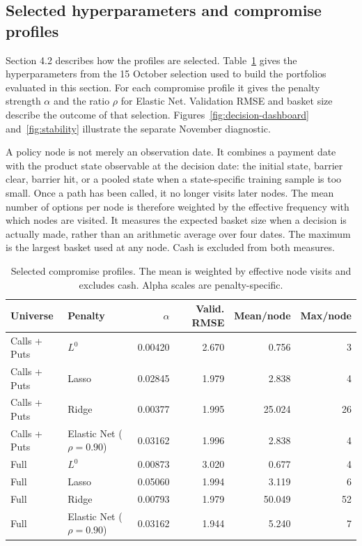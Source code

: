 \subsection{Selected hyperparameters and compromise profiles}

Section 4.2 describes how the profiles are selected. Table~\ref{tab:selected} gives the hyperparameters from the 15 October selection used to build the portfolios evaluated in this section. For each compromise profile it gives the penalty strength $\alpha$ and the ratio $\rho$ for Elastic Net. Validation RMSE and basket size describe the outcome of that selection. Figures~\ref{fig:decision-dashboard} and~\ref{fig:stability} illustrate the separate November diagnostic.

A policy node is not merely an observation date. It combines a payment date with the product state observable at the decision date: the initial state, barrier clear, barrier hit, or a pooled state when a state-specific training sample is too small. Once a path has been called, it no longer visits later nodes. The mean number of options per node is therefore weighted by the effective frequency with which nodes are visited. It measures the expected basket size when a decision is actually made, rather than an arithmetic average over four dates. The maximum is the largest basket used at any node. Cash is excluded from both measures.

\begin{table}[htbp]
\centering
\small
\begin{tabular}{llrrrr}
\toprule
Universe & Penalty & $\alpha$ & Valid. RMSE & Mean/node & Max/node \\
\midrule
Calls + Puts & $L^0$ & 0.00420 & 2.670 & 0.756 & 3 \\
Calls + Puts & Lasso & 0.02845 & 1.979 & 2.838 & 4 \\
Calls + Puts & Ridge & 0.00377 & 1.995 & 25.024 & 26 \\
Calls + Puts & Elastic Net ($\rho=0.90$) & 0.03162 & 1.996 & 2.838 & 4 \\
Full & $L^0$ & 0.00873 & 3.020 & 0.677 & 4 \\
Full & Lasso & 0.05060 & 1.994 & 3.119 & 6 \\
Full & Ridge & 0.00793 & 1.979 & 50.049 & 52 \\
Full & Elastic Net ($\rho=0.90$) & 0.03162 & 1.944 & 5.240 & 7 \\
\bottomrule
\end{tabular}
\caption{Selected compromise profiles. The mean is weighted by effective node visits and excludes cash. Alpha scales are penalty-specific.}
\label{tab:selected}
\end{table}

